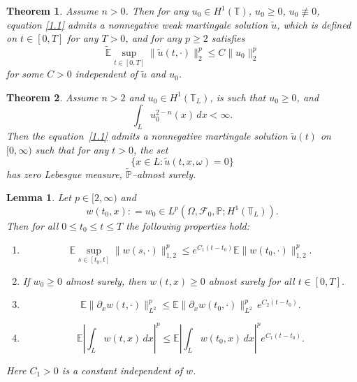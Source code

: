 \documentclass[10pt,a4paper]{amsart}
\newtheorem{theorem}{Theorem}
\newtheorem{lemma}{Lemma}
\def\E{\mathbb{E}}
\def\d{\partial}
\def\tu{\tilde{u}}
\begin{document}
\begin{theorem}\label{Th:2.1}
Assume $n > 0$. Then for any
$u_0 \in H^1(\mathbb{T})$, $u_0 \ge 0$, $u_0 \not\equiv 0$,
equation \eqref{1.1} admits a nonnegative weak martingale solution $\tilde{u}$, which is defined on $t \in [0,T]$ for any $T > 0$, and for any $p \geq 2$ satisfies
\[
\tilde{\E} \sup_{t \in [0,T]} \|\tilde{u}(t,\cdot)\|_2^p \leq C \| u_0\|^p_2
\]
for some $C>0$ independent of $\tilde{u}$ and $u_0$.
\end{theorem}

\begin{theorem}\label{th:2.2}
Assume $n>2$ and $u_0 \in H^1(\mathbb{T}_L)$, is such that $u_0 \ge 0$, and
\[
\int_L u_0^{2-n}(x) \, dx < \infty.
\]
Then the equation~\eqref{1.1} admits a nonnegative martingale solution
$\tu(t)$ on $[0,\infty)$ such that for any $t>0$,
the set
\[
\{x \in L : \tu(t,x,\omega)=0\}
\]
has zero Lebesgue measure, $\tilde{\mathbb{P}}$--almost surely.
\end{theorem}

\begin{lemma}
\label{lem:3.4}
Let $p \in [2,\infty)$ and
\[
w(t_0,x): = w_0 \in L^p(\Omega,\mathcal{F}_0,\mathbb{P}; H^1(\mathbb{T}_L)).
\]
Then for all $0 \leq t_0 \leq t \leq T$ the following properties hold:
\begin{enumerate}
\item
\begin{equation}
\label{3.6}
\mathbb{E} \sup_{s \in [t_0,t]} \|w(s, \cdot)\|_{1,2}^p
\le e^{C_1(t-t_0)} \mathbb{E} \|w (t_0, \cdot)\|_{1,2}^p.
\end{equation}

\item
If $w_0 \ge 0$ almost surely, then
$w(t,x) \ge 0$ almost surely for all $t \in [0,T]$.



\item 
\begin{equation}
\label{3.7}
\mathbb{E}\|\d_x w(t, \cdot)\|_{L^2}^p
\le
\mathbb{E}\|\d_x w(t_0, \cdot)\|_{L^2}^p \,
e^{C_2 (t-t_0)}.
\end{equation}

\item
\begin{equation}
\label{3.7.1}
\mathbb{E}\left|\int_{L} w(t,x)\,dx\right|^p
\le
\mathbb{E}\left|\int_{L} w(t_0,x)\,dx\right|^p
e^{C_1 (t-t_0)}.
\end{equation}
\end{enumerate}
Here $C_1>0$ is a constant independent of $w$.
\end{lemma}
\end{document}
